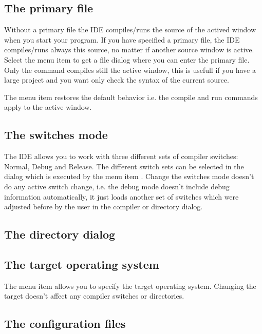\subsection{The primary file}
Without a primary file the IDE compiles/runs the source of the actived
window when you start your program. If you have specified a primary
file, the IDE compiles/runs always this source, no matter if another
source window is active. Select the menu item 
to get a file dialog where you can enter the primary file. Only the command
 compiles still the active window, this is usefull
if you have a large project and you want only check the syntax of the
current source.

The menu item  restores the default behavior
i.e. the compile and run commands apply to the active window.

\subsection{The switches mode}
The IDE allows you to work with three different sets of compiler
switches: Normal, Debug and Release. The different switch
sets can be selected in the  dialog which
is executed by the menu item .
Change the switches mode doesn't do any active switch change, i.e.
the debug mode doesn't include debug information automatically,
it just loads another set of switches which were adjusted before
by the user in the compiler or directory dialog.

\subsection{The directory dialog}

\subsection{The target operating system}
The menu item  allows you to specify the target
operating system. Changing the target doesn't affect any compiler
switches or directories.

\subsection{The configuration files}

